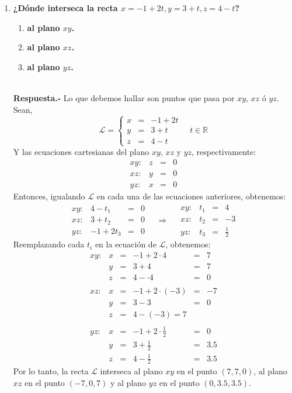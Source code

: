 \begin{enumerate}
    \item \textbf{\boldmath ¿Dónde interseca la recta $x=-1+2t,y=3+t,z=4-t$?}
	\begin{enumerate}[\bfseries a)]
	    \item \textbf{\boldmath al plano $xy$.}
	    \item \textbf{\boldmath al plano $xz$.}
	    \item \textbf{\boldmath al plano $yz$.}\\\\
	\end{enumerate}
	\textbf{Respuesta.-}\; Lo que debemos hallar son puntos que pasa por $xy$, $xz$ ó $yz$.\\
	Sean,
	$$
	\mathscr{L} =\left\{\begin{array}{rcr}
		x&=&-1+2t\\
		y&=&3+t\\
		z&=&4-t
	\end{array}\right.\quad t\in \mathbb{R}
	$$
	Y las ecuaciones cartesianas del plano $xy$, $xz$ y $yz$, respectivamente:
	$$ 
	\begin{array}{rrcr}
	    xy:&z&=&0\\
	    xz:&y&=&0\\
	    yz:&x&=&0
	\end{array}
	$$
	Entonces, igualando $\mathscr{L}$ en cada una de las ecuaciones anteriores, obtenemos:
	$$
	\begin{array}{rrcr}
	    xy:&4-t_1&=&0\\
	    xz:&3+t_2&=&0\\
	    yz:&-1+2t_3&=&0
	\end{array}
	\quad \Rightarrow \quad
	\begin{array}{rrcr}
	    xy:&t_1&=&4\\
	    xz:&t_2&=&-3\\
	    yz:&t_3&=&\frac{1}{2}
	\end{array}
	$$
	Reemplazando cada $t_i$ en la ecuación de $\mathscr{L}$, obtenemos:
	$$
	\begin{array}{rrcccr}
	    xy:&x&=&-1+2\cdot 4&=&7\\
	       &y&=&3+4&=&7\\
	       &z&=&4-\cdot4&=&0\\\\
	    xz:&x&=&-1+2\cdot (-3)&=&-7\\
	       &y&=&3-3&=&0\\
	    &z&=&4-(-3)=7\\\\
	    yz:&x&=&-1+2\cdot \frac{1}{2}&=&0\\
	       &y&=&3+\frac{1}{2}&=&3.5\\
	       &z&=&4-\frac{1}{2}&=&3.5
	\end{array}
	$$
	Por lo tanto, la recta $\mathscr{L}$ interseca al plano $xy$ en el punto $(7,7,0)$, al plano $xz$ en el punto $(-7,0,7)$ y al plano $yz$ en el punto $(0,3.5,3.5)$.\\\\


\end{enumerate}

